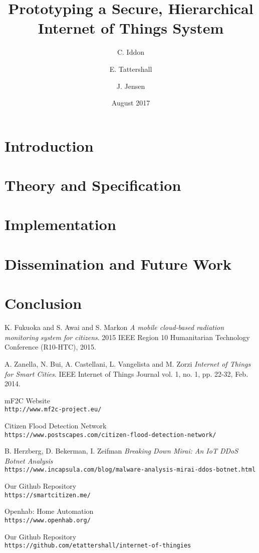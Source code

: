 \documentclass{article}
\title{Prototyping a Secure, Hierarchical Internet of Things System}
\author{
  C. Iddon
  \and
  E. Tattershall
  \and
  J. Jensen
}
\date{August 2017}
\begin{document}
\maketitle

\section{Introduction}


\section{Theory and Specification}


\section{Implementation}


\section{Dissemination and Future Work}


\section{Conclusion}


\begin{thebibliography}{9}
K. Fukuoka and S. Awai and S. Markon
\textit{A mobile cloud-based radiation monitoring system for citizens}.
2015 IEEE Region 10 Humanitarian Technology Conference (R10-HTC), 2015.

A. Zanella, N. Bui, A. Castellani, L. Vangelista and M. Zorzi
\textit{Internet of Things for Smart Cities}.
IEEE Internet of Things Journal vol. 1, no. 1, pp. 22-32, Feb. 2014.

mF2C Website
\\\texttt{http://www.mf2c-project.eu/}

Citizen Flood Detection Network
\\\texttt{https://www.postscapes.com/citizen-flood-detection-network/}

B. Herzberg, D. Bekerman, I. Zeifman
\textit{Breaking Down Mirai: An IoT DDoS Botnet Analysis}
\\\texttt{https://www.incapsula.com/blog/malware-analysis-mirai-ddos-botnet.html}

Our Github Repository
\\\texttt{https://smartcitizen.me/}

Openhab: Home Automation
\\\texttt{https://www.openhab.org/}

Our Github Repository
\\\texttt{https://github.com/etattershall/internet-of-thingies}

\end{thebibliography}
\end{document}
